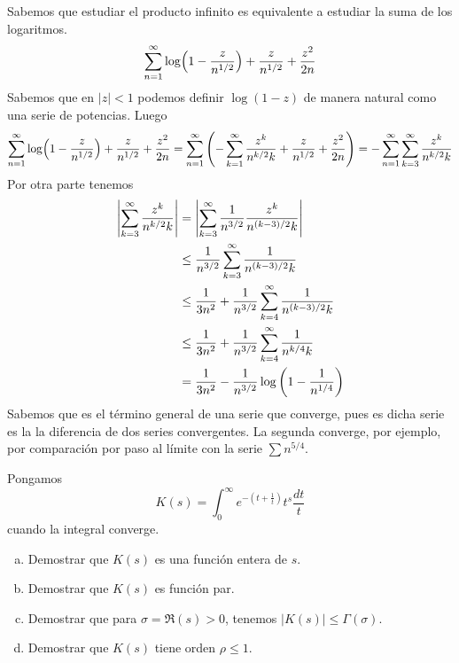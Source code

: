 \documentclass[twoside]{article}
\begin{document}
\begin{solucion}
Sabemos que estudiar el producto infinito es equivalente a estudiar la suma de los logaritmos.
$$
\sum_{n=1}^\infty \log\Bigl(1-\frac{z}{n^{1/2}}\Bigr) + \frac{z}{n^{1/2}}+\frac{z^2}{2n}
$$
Sabemos que en $|z|<1$ podemos definir $\log (1-z)$ de manera natural como una serie de potencias. Luego
$$
\sum_{n=1}^\infty \log\Bigl(1-\frac{z}{n^{1/2}}\Bigr) + \frac{z}{n^{1/2}}+\frac{z^2}{2n} = \sum_{n=1}^\infty\left( -\sum_{k=1}^\infty \frac{z^k}{n^{k/2}k} + \frac{z}{n^{1/2}}+\frac{z^2}{2n}\right) = -\sum_{n=1}^\infty \sum_{k=3}^\infty \frac{z^k}{n^{k/2}k}
$$
Por otra parte tenemos
\begin{align*}
\left\lvert\sum_{k=3}^\infty \frac{z^k}{n^{k/2}k}\right\rvert &= \left\lvert\sum_{k=3}^\infty \frac{1}{n^{3/2}}\frac{z^k}{n^{(k-3)/2}k}\right\rvert\\
& \leq  \frac{1}{n^{3/2}}\sum_{k=3}^\infty \frac{1}{n^{(k-3)/2}k}\\
&\leq  \frac{1}{3n^2}+ \frac{1}{n^{3/2}}\sum_{k=4}^\infty \frac{1}{n^{(k-3)/2}k}\\
&\leq  \frac{1}{3n^2}+ \frac{1}{n^{3/2}}\sum_{k=4}^\infty \frac{1}{n^{k/4}k} \\
& =  \frac{1}{3n^2}- \frac{1}{n^{3/2}}\log\left(1-\frac{1}{n^{1/4}}\right)
\end{align*}
Sabemos que es el término general de una serie que converge, pues es dicha serie es la la diferencia de dos series convergentes. La segunda converge, por ejemplo, por comparación por paso al límite con la serie $\sum n^{5/4}$.
\end{solucion}
\newpage
\begin{ejercicio}{11}
Pongamos
$$K(s)=\int_0^\infty e^{-(t+\frac{1}{t})}t^s\frac{dt}{t}$$
cuando la integral converge. 
\begin{enumerate}[a)]
\item Demostrar que $K(s)$ es una función entera de $s$.
\item Demostrar que $K(s)$ es función par.
\item Demostrar que para $\sigma=\Re(s)>0$, tenemos
$|K(s)|\le \Gamma(\sigma)$.
\item Demostrar que $K(s)$ tiene orden $\rho\le1$.
\end{enumerate}
\end{ejercicio}
\end{document}
